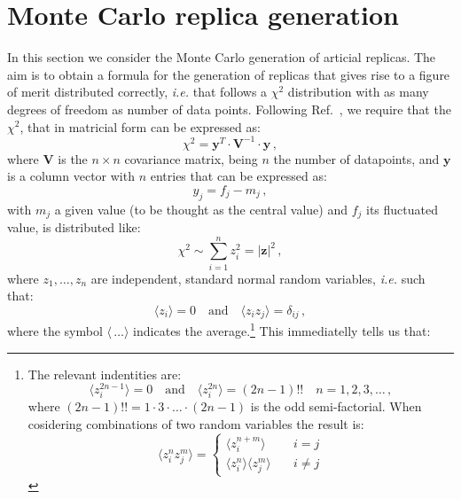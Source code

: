 \documentclass[10pt,a4paper]{article}
\begin{document}
\section{Monte Carlo replica generation}

In this section we consider the Monte Carlo generation of articial
replicas. The aim is to obtain a formula for the generation of
replicas that gives rise to a figure of merit distributed correctly,
\textit{i.e.} that follows a $\chi^2$ distribution with as many
degrees of freedom as number of data points. Following
Ref.~\cite{wiki:xxx}, we require that the $\chi^2$, that in matricial
form can be expressed as:
\begin{equation}\label{eq:chi2matrix}
  \chi^2 = \mathbf{y}^{T}\cdot \mathbf{V}^{-1} \cdot \mathbf{y}\,,
\end{equation}
where $\mathbf{V}$ is the $n\times n$ covariance matrix, being $n$ the
number of datapoints, and $\mathbf{y}$ is a column vector with $n$
entries that can be expressed as:
\begin{equation}
y_j = f_j-m_j\,,
\end{equation}
with $m_j$ a given value (to be thought as the central value) and
$f_j$ its fluctuated value, is distributed like:
\begin{equation}\label{eq:wikipedia}
\chi^2\sim \sum_{i=1}^{n}z_i^2=|\mathbf{z}|^2\,,
\end{equation}
where $z_1,\dots , z_n$ are independent, standard normal random
variables, \textit{i.e.} such that:
\begin{equation}\label{eq:averages}
\langle z_i\rangle=0\quad\mbox{and}\quad \langle z_iz_j\rangle = \delta_{ij}\,,
\end{equation}
where the symbol $\langle\,\dots\rangle$ indicates the
average.\footnote{The relevant indentities are:
\begin{equation}
  \langle z_i^{2n-1}\rangle = 0\quad\mbox{and}\quad \langle
  z_i^{2n}\rangle= (2n-1)!!\quad n=1,2,3,\dots\,,
\end{equation}
where $(2n-1)!!=1\cdot3\cdot\dots\cdot(2n-1)$ is the odd
semi-factorial. When cosidering combinations of two random variables
the result is:
\begin{equation}
  \langle z_i^n z_j^m\rangle = \left\{
\begin{array}{ll}
\langle z_i^{n+m}\rangle&\quad i = j\\
\langle z_i^n\rangle\langle z_j^m\rangle&\quad i \neq j
\end{array}
\right.
\end{equation}} This immediatelly tells us that:
\end{document}
